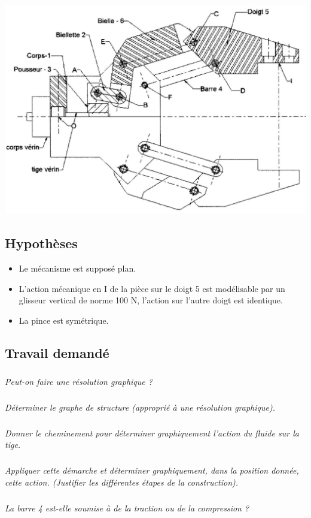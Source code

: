 \documentclass[10pt]{article}
\begin{document}
\begin{center}
\includegraphics[width=.8\textwidth]{images/fig_02}
\end{center}

\subsection*{Hypothèses}

\begin{itemize}
\item Le mécanisme est supposé plan. 
\item L’action mécanique en I de la pièce sur le doigt 5 est modélisable par un glisseur vertical de norme 
100 N, l’action sur l’autre doigt est identique. 
\item La pince est symétrique. 
\end{itemize}


\subsection*{Travail demandé}

\subparagraph{}
\textit{Peut-on faire une résolution graphique ? }

\subparagraph{}
\textit{Déterminer le graphe de structure (approprié à une résolution graphique).}

\subparagraph{}
\textit{Donner le cheminement pour déterminer graphiquement l’action du fluide sur la tige. }

\subparagraph{}
\textit{Appliquer cette démarche et déterminer graphiquement, dans la position donnée, cette action. 
(Justifier les différentes étapes de la construction).}

\subparagraph{}
\textit{La barre 4 est-elle soumise à de la traction ou de la compression ?}
\end{document}
